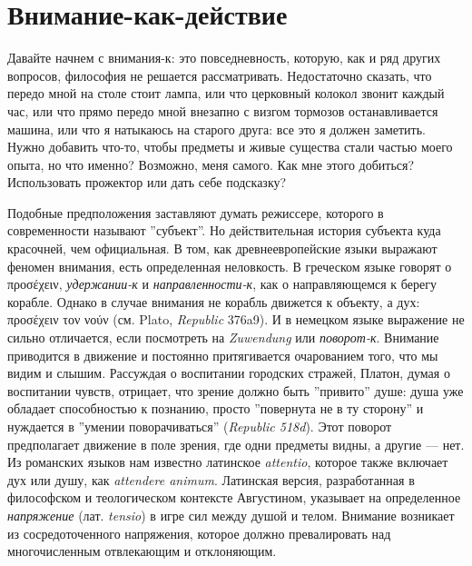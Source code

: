 \documentclass[12pt]{book}
\begin{document}
\section{Внимание-как-действие}

Давайте начнем с внимания-к: это повседневность, которую, как и ряд других вопросов, философия не решается рассматривать. Недостаточно сказать, что передо мной на столе стоит лампа, или что церковный колокол звонит каждый час, или что прямо передо мной внезапно с визгом тормозов останавливается машина, или что я натыкаюсь на старого друга: все это я должен заметить. Нужно добавить что-то, чтобы предметы и живые существа стали частью моего опыта, но что именно? Возможно, меня самого. Как мне этого добиться? Использовать прожектор или дать себе подсказку?

Подобные предположения заставляют думать режиссере, которого в современности называют ''субъект''. Но действительная история субъекта куда красочней, чем официальная. В том, как древнеевропейские языки выражают феномен внимания, есть определенная неловкость. В греческом языке говорят о προσέχειν, \textit{удержании-к} и \textit{направленности-к}, как о направляющемся к берегу корабле. Однако в случае внимания не корабль движется к объекту, а дух: προσέχειν τον νούν (см. Plato, \textit{Republic} 376a9). И в немецком языке выражение не сильно отличается, если посмотреть на \textit{Zuwendung} или \textit{поворот-к}. Внимание приводится в движение и постоянно притягивается очарованием того, что мы видим и слышим. Рассуждая о воспитании городских стражей, Платон, думая о воспитании чувств, отрицает, что зрение должно быть ''привито'' душе: душа уже обладает способностью к познанию, просто ''повернута не в ту сторону'' и нуждается в ''умении поворачиваться'' (\textit{Republic 518d}). Этот поворот предполагает движение в поле зрения, где одни предметы видны, а другие --- нет. Из романских языков нам известно латинское \textit{attentio}, которое также включает дух или душу, как \textit{attendere animum}. Латинская версия, разработанная в философском и теологическом контексте Августином, указывает на определенное \textit{напряжение} (лат. \textit{tensio}) в игре сил между душой и телом. Внимание возникает из сосредоточенного напряжения, которое должно превалировать над многочисленным отвлекающим и отклоняющим.
\end{document}
